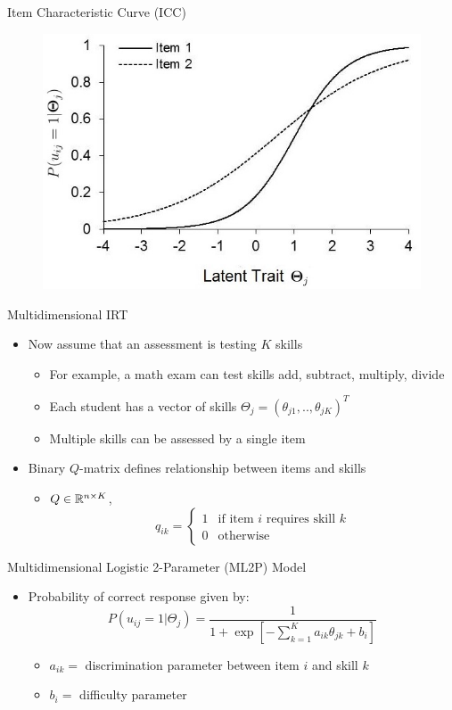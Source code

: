\documentclass{beamer}
\def \R{\ensuremath \mathbb{R}}
\theoremstyle{definition}
\begin{document}
\begin{frame}{Item Characteristic Curve (ICC)}
\begin{figure}
  \includegraphics[width=.7\textwidth]{../img/logistic_2param_icc.jpg}
\end{figure}

\end{frame}
\begin{frame}{Multidimensional IRT}
\begin{itemize}
  \item Now assume that an assessment is testing $K$ skills
  \begin{itemize}
    \item For example, a math exam can test skills add, subtract, multiply, divide
    \item Each student has a vector of skills $\Theta_j = (\theta_{j1},.., \theta_{jK})^T$
    \item Multiple skills can be assessed by a single item
  \end{itemize}
  \item<2-> Binary $Q$-matrix defines relationship between items and skills
  \begin{itemize}
    \item<2-> $Q \in \R^{n \times K}$, \[q_{ik} = \begin{cases}
    1 & \text{if item } i \text{ requires skill } k \\ 
    0 & \text{otherwise} 
    \end{cases}\]
  \end{itemize}
\end{itemize}
\end{frame}

\begin{frame}{Multidimensional Logistic 2-Parameter (ML2P) Model}
\begin{itemize}
\item Probability of correct response given by:
  \[P(u_{ij}=1 | \Theta_j) = \frac{1}{1 + \exp[-\sum_{k=1}^K a_{ik}\theta_{jk} + b_i]}\]
  \begin{itemize}
    \item<2-> $a_{ik} =$ discrimination parameter between item $i$ and skill $k$ 
    \item<2-> $b_i =$ difficulty parameter
  \end{itemize}
\end{itemize}
\end{frame}
\end{document}
